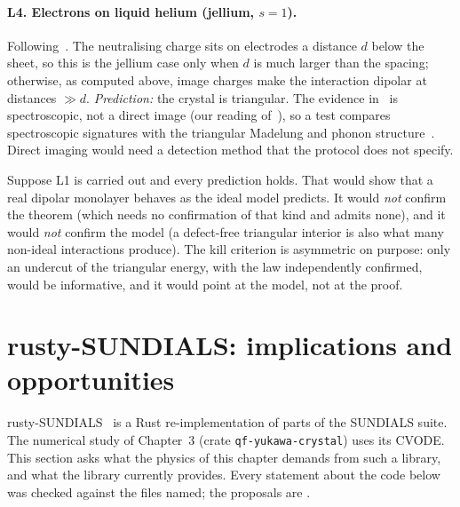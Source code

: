 \paragraph{L4. Electrons on liquid helium (jellium, $s=1$).} Following~\cite{grimes}. The neutralising charge sits
on electrodes a distance $d$ below the sheet, so this is the jellium case only when $d$ is much larger than the
spacing; otherwise, as computed above, image charges make the interaction dipolar at distances $\gg d$.
\emph{Prediction:} the crystal is triangular. The evidence in~\cite{grimes} is spectroscopic, not a direct image \tierC{} (our reading of~\cite{grimes}), so
a test compares spectroscopic signatures with the triangular Madelung and phonon structure~\cite{bm}. Direct
imaging would need a detection method that the protocol does not specify.

\begin{warnbox}
Suppose L1 is carried out and every prediction holds. That would show that a real dipolar monolayer behaves as the
ideal model predicts. It would \emph{not} confirm the theorem (which needs no confirmation of that kind and admits
none), and it would \emph{not} confirm the model (a defect-free triangular interior is also what many non-ideal
interactions produce). The kill criterion is asymmetric on purpose: only an undercut of the triangular energy,
with the law independently confirmed, would be informative, and it would point at the model, not at the proof.
\end{warnbox}

\section{rusty-SUNDIALS: implications and opportunities}\label{sec:ch4-rusty}

rusty-SUNDIALS~\cite{rusty} is a Rust re-implementation of parts of the SUNDIALS suite. The numerical study of
Chapter~3 (crate \texttt{qf-yukawa-crystal}) uses its CVODE. This section asks what the physics of this chapter
demands from such a library, and what the library currently provides. Every statement about the code below was
checked against the files named; the proposals are \tierC.

